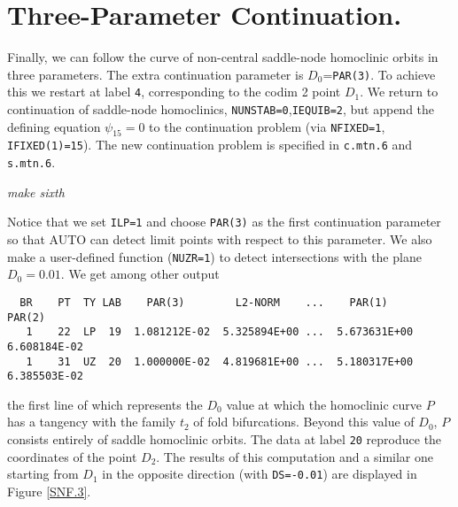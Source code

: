 \documentclass[12pt]{report}
\begin{document}
\section{Three-Parameter Continuation.}
Finally, we can follow the curve of non-central saddle-node homoclinic
orbits in three parameters. The extra continuation parameter is
$D_0$={\tt PAR(3)}.  To achieve this we restart at label {\tt 4},
corresponding to the codim 2 point $D_1$. We return to continuation of
saddle-node homoclinics, {\tt NUNSTAB=0},{\tt IEQUIB=2}, but append the
defining equation $\psi_{15}=0$ to the continuation problem
(via {\tt NFIXED=1}, {\tt IFIXED(1)=15}). The new
continuation problem is specified in {\tt c.mtn.6} and {\tt s.mtn.6}.
\begin{center}
{\it make sixth}
\end{center}
Notice that we set {\tt ILP=1} and choose {\tt PAR(3)} as the first 
continuation parameter so that {\cal AUTO} can detect limit points 
with respect to this parameter. We also make a user-defined function
({\tt NUZR=1})
to detect intersections with the plane $D_0=0.01$.
We get among other output
\begin{verbatim}
  BR    PT  TY LAB    PAR(3)        L2-NORM    ...    PAR(1)        PAR(2)
   1    22  LP  19  1.081212E-02  5.325894E+00 ...  5.673631E+00  6.608184E-02
   1    31  UZ  20  1.000000E-02  4.819681E+00 ...  5.180317E+00  6.385503E-02
\end{verbatim}
the first line of which represents the $D_0$ value at which 
the homoclinic curve $P$ has a tangency with the family $t_2$ 
of fold bifurcations. Beyond this value of $D_0$,
$P$ consists entirely of saddle homoclinic orbits. The data at label {\tt 20} 
reproduce the coordinates of the point $D_2$. The results of this
computation and a similar one starting from $D_1$ in the opposite direction
(with {\tt DS=-0.01}) are displayed in Figure \ref{SNF.3}.
%

\newpage
\end{document}
